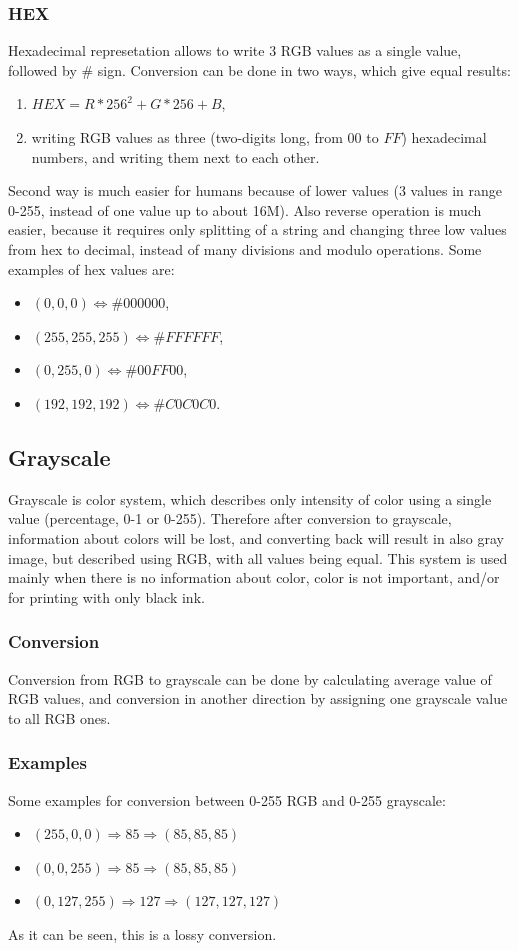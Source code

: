 \documentclass[titlepage]{article}
\begin{document}
\subsubsection{HEX}
Hexadecimal represetation allows to write 3 RGB values as a single value,
followed by \# sign. Conversion can be done in two ways, which give equal
results:
\begin{enumerate}
  \item $HEX=R*256^2+G*256+B$,
  \item writing RGB values as three (two-digits long, from $00$ to $FF$)
  hexadecimal numbers, and writing them next to each other.
\end{enumerate}
Second way is much easier for humans because of lower values (3 values in
range 0-255, instead of one value up to about 16M). Also reverse operation
is much easier, because it requires only splitting of a string and changing
three low values from hex to decimal, instead of many divisions and modulo
operations. Some examples of hex values are:
\begin{itemize}
  \item $(0, 0, 0) \Leftrightarrow \#000000$,
  \item $(255, 255, 255) \Leftrightarrow \#FFFFFF$,
  \item $(0, 255, 0) \Leftrightarrow \#00FF00$,
  \item $(192, 192, 192) \Leftrightarrow \#C0C0C0$.
\end{itemize}

\subsection{Grayscale}
Grayscale is color system, which describes only intensity of color using a
single value (percentage, 0-1 or 0-255). Therefore after conversion to
grayscale, information about colors will be lost, and converting back will
result in also gray image, but described using RGB, with all values being equal.
This system is used mainly when there is no information about color, color is
not important, and/or for printing with only black ink.
\subsubsection{Conversion}
Conversion from RGB to grayscale can be done by calculating average value of RGB
values, and conversion in another direction by assigning one grayscale value to
all RGB ones.

\subsubsection{Examples}
Some examples for conversion between 0-255 RGB and 0-255 grayscale:
\begin{itemize}
  \item $(255, 0, 0) \Rightarrow 85 \Rightarrow (85, 85, 85)$
  \item $(0, 0, 255) \Rightarrow 85 \Rightarrow (85, 85, 85)$
  \item $(0, 127, 255) \Rightarrow 127 \Rightarrow (127, 127, 127)$
\end{itemize}
As it can be seen, this is a lossy conversion.
\end{document}
